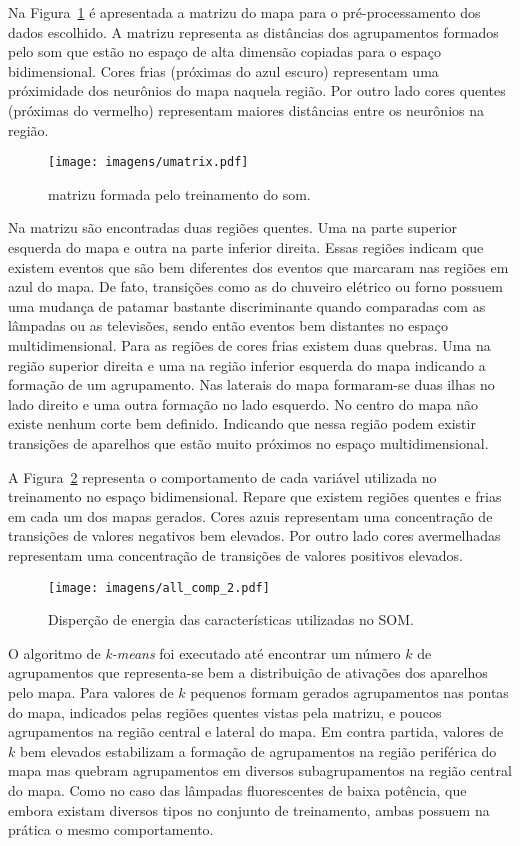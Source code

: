 Na Figura~\ref{fig:matrizu_res} é apresentada a \gls{matrizu} do mapa para o
pré-processamento dos dados escolhido. A \gls{matrizu} representa as
distâncias dos agrupamentos formados pelo \gls{som} que estão no
espaço de alta dimensão copiadas para o espaço bidimensional. Cores
frias (próximas do azul escuro) representam uma próximidade dos
neurônios do mapa naquela região. Por outro lado cores quentes
(próximas do vermelho) representam maiores distâncias entre os
neurônios na região.

\begin{figure}[!htb]
\centering
\texttt{[image: imagens/umatrix.pdf]}
\caption[Matriz-U formada pelo treinamento do SOM]
{\acs{matrizu} formada pelo treinamento do \acs{som}.}
\label{fig:matrizu_res}
\end{figure}

Na \acs{matrizu} são encontradas duas regiões quentes. Uma na parte
superior esquerda do mapa e outra na parte inferior direita. Essas
regiões indicam que existem eventos que são bem diferentes dos eventos
que marcaram nas regiões em azul do mapa. De fato, transições como as
do chuveiro elétrico ou forno possuem uma mudança de patamar bastante
discriminante quando comparadas com as lâmpadas ou as televisões,
sendo então eventos bem distantes no espaço multidimensional. Para as
regiões de cores frias existem duas quebras. Uma na região superior
direita e uma na região inferior esquerda do mapa indicando a formação
de um agrupamento. Nas laterais do mapa formaram-se duas ilhas no lado
direito e uma outra formação no lado esquerdo. No centro do mapa não
existe nenhum corte bem definido. Indicando que nessa região podem
existir transições de aparelhos que estão muito próximos no espaço
multidimensional.
	
A Figura~\ref{fig:allhits} representa o comportamento de cada variável
utilizada no treinamento no espaço bidimensional. Repare que existem
regiões quentes e frias em cada um dos mapas gerados. Cores azuis
representam uma concentração de transições de valores negativos bem
elevados. Por outro lado cores avermelhadas representam uma
concentração de transições de valores positivos elevados.	
	
\begin{figure}[!htb]
\centering
\texttt{[image: imagens/all\_comp\_2.pdf]}
\caption{Disperção de energia das características utilizadas no SOM.}
\label{fig:allhits}
\end{figure}
	
O algoritmo de \emph{k-means} foi executado até encontrar um número
$k$ de agrupamentos que representa-se bem a distribuição de ativações
dos aparelhos pelo mapa. Para valores de $k$ pequenos formam gerados
agrupamentos nas pontas do mapa, indicados pelas regiões quentes
vistas pela \acs{matrizu}, e poucos agrupamentos na região central e
lateral do mapa. Em contra partida, valores de $k$ bem elevados
estabilizam a formação de agrupamentos na região periférica do mapa
mas quebram agrupamentos em diversos subagrupamentos na região
central do mapa. Como no caso das lâmpadas fluorescentes de baixa
potência, que embora existam diversos tipos no conjunto de
treinamento, ambas possuem na prática o mesmo comportamento.
	
